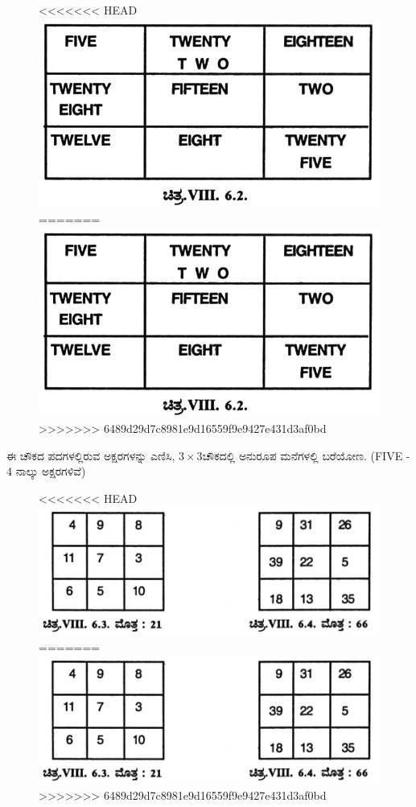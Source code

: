 \newpage

\begin{figure}[H]
<<<<<<< HEAD
\includegraphics{src/figures/chap7/fig7-22.jpg}
=======
\includegraphics[scale=0.8]{src/figures/chap7/fig7.22.jpg}
>>>>>>> 6489d29d7c8981e9d16559f9e9427e431d3af0bd
\end{figure}

ಈ ಚೌಕದ ಪದಗಳಲ್ಲಿರುವ ಅಕ್ಷರಗಳನ್ನು ಎಣಿಸಿ, $3 \times 3$ಚೌಕದಲ್ಲಿ ಅನುರೂಪ ಮನೆ\-ಗಳಲ್ಲಿ ಬರೆಯೋಣ. (FIVE - 4 ನಾಲ್ಕು ಅಕ್ಷರಗಳಿವೆ)
\begin{figure}[H]
<<<<<<< HEAD
\includegraphics{src/figures/chap7/fig7-23.jpg}
=======
\includegraphics[scale=0.8]{src/figures/chap7/fig7.23.jpg}
>>>>>>> 6489d29d7c8981e9d16559f9e9427e431d3af0bd
\end{figure}

